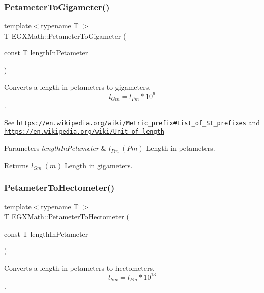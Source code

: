 \subsubsection{\texorpdfstring{Petameter\+To\+Gigameter()}{PetameterToGigameter()}}
{\footnotesize\ttfamily template$<$typename T $>$ \\
T E\+G\+X\+Math\+::\+Petameter\+To\+Gigameter (\begin{DoxyParamCaption}\item[{const T}]{length\+In\+Petameter }\end{DoxyParamCaption})}



Converts a length in petameters to gigameters. \[ l_{Gm}=l_{Pm} * 10^{6} \]. 

See \href{https://en.wikipedia.org/wiki/Metric_prefix#List_of_SI_prefixes}{\tt https\+://en.\+wikipedia.\+org/wiki/\+Metric\+\_\+prefix\#\+List\+\_\+of\+\_\+\+S\+I\+\_\+prefixes} and \href{https://en.wikipedia.org/wiki/Unit_of_length}{\tt https\+://en.\+wikipedia.\+org/wiki/\+Unit\+\_\+of\+\_\+length} 
\begin{DoxyParams}{Parameters}
{\em length\+In\+Petameter} & $ l_{Pm}\ (Pm)$ Length in petameters. \\
\hline
\end{DoxyParams}
\begin{DoxyReturn}{Returns}
$ l_{Gm}\ (m)$ Length in gigameters. 
\end{DoxyReturn}
\mbox{\label{group___e_g_x_math-_conversions-_length_conversions-_petameter-_s_i_ga18de0d328d6200590dd25a522ad1aeb4}} 
\subsubsection{\texorpdfstring{Petameter\+To\+Hectometer()}{PetameterToHectometer()}}
{\footnotesize\ttfamily template$<$typename T $>$ \\
T E\+G\+X\+Math\+::\+Petameter\+To\+Hectometer (\begin{DoxyParamCaption}\item[{const T}]{length\+In\+Petameter }\end{DoxyParamCaption})}



Converts a length in petameters to hectometers. \[ l_{hm}=l_{Pm} * 10^{13} \]. 

